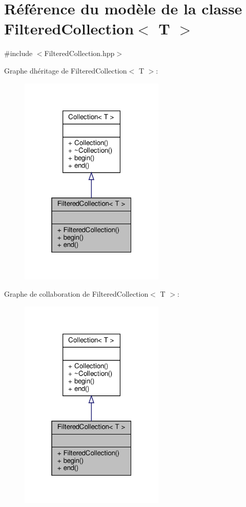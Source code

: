 \hypertarget{class_filtered_collection}{}\section{Référence du modèle de la classe Filtered\+Collection$<$ T $>$}
\label{class_filtered_collection}


{\ttfamily \#include $<$Filtered\+Collection.\+hpp$>$}



Graphe d\textquotesingle{}héritage de Filtered\+Collection$<$ T $>$\+:\nopagebreak
\begin{figure}[H]
\begin{center}
\leavevmode
\includegraphics[width=196pt]{class_filtered_collection__inherit__graph}
\end{center}
\end{figure}


Graphe de collaboration de Filtered\+Collection$<$ T $>$\+:\nopagebreak
\begin{figure}[H]
\begin{center}
\leavevmode
\includegraphics[width=196pt]{class_filtered_collection__coll__graph}
\end{center}
\end{figure}
